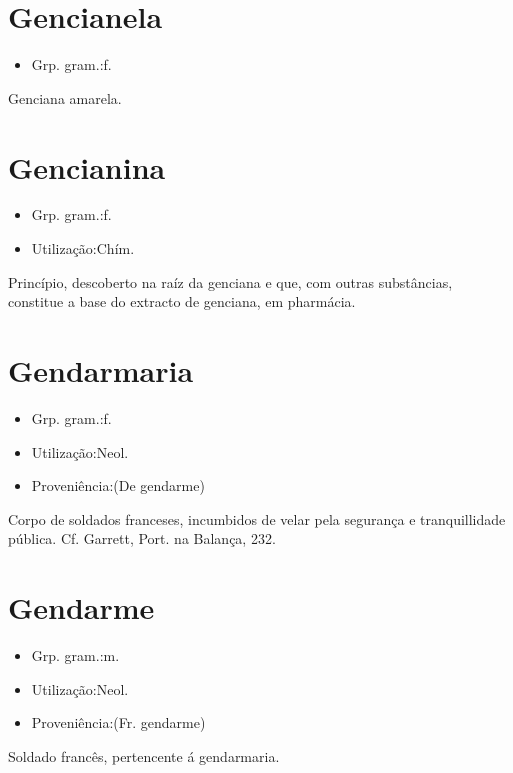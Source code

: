 \section{Gencianela}
\begin{itemize}
\item {Grp. gram.:f.}
\end{itemize}
Genciana amarela.
\section{Gencianina}
\begin{itemize}
\item {Grp. gram.:f.}
\end{itemize}
\begin{itemize}
\item {Utilização:Chím.}
\end{itemize}
Princípio, descoberto na raíz da genciana e que, com outras substâncias, constitue a base do extracto de genciana, em pharmácia.
\section{Gendarmaria}
\begin{itemize}
\item {Grp. gram.:f.}
\end{itemize}
\begin{itemize}
\item {Utilização:Neol.}
\end{itemize}
\begin{itemize}
\item {Proveniência:(De \textunderscore gendarme\textunderscore )}
\end{itemize}
Corpo de soldados franceses, incumbidos de velar pela segurança e tranquillidade pública. Cf. Garrett, \textunderscore Port. na Balança\textunderscore , 232.
\section{Gendarme}
\begin{itemize}
\item {Grp. gram.:m.}
\end{itemize}
\begin{itemize}
\item {Utilização:Neol.}
\end{itemize}
\begin{itemize}
\item {Proveniência:(Fr. \textunderscore gendarme\textunderscore )}
\end{itemize}
Soldado francês, pertencente á gendarmaria.
